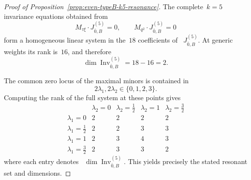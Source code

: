 \documentclass[12pt,a4paper]{amsart}
\theoremstyle{thm}
\theoremstyle{definition}
\begin{document}
\begin{proof}[Proof of Proposition~\textup{\ref{prop:even-typeB-k5-resonance}}]
The complete~\(k=5\) invariance equations obtained from
\[
M_{\tau\xi}\cdot J_{\bar0,B}^{(5)}=0,
\qquad
M_{q^2}\cdot J_{\bar0,B}^{(5)}=0
\]
form a homogeneous linear system in the~\(18\) coefficients of~%
\(J_{\bar0,B}^{(5)}\). At generic weights its rank is~\(16\), and
therefore
\[
\dim\operatorname{Inv}_{\bar0,B}^{(5)}=18-16=2.
\]

The common zero locus of the maximal minors is contained in
\[
2\lambda_1,2\lambda_2\in\{0,1,2,3\}.
\]
Computing the rank of the full system at these points gives
\[
\begin{array}{c|cccc}
 & \lambda_2=0
 & \lambda_2=\frac12
 & \lambda_2=1
 & \lambda_2=\frac32 \\ \hline
\lambda_1=0
 &2&2&2&2\\[1mm]
\lambda_1=\frac12
 &2&2&3&3\\[1mm]
\lambda_1=1
 &2&3&4&3\\[1mm]
\lambda_1=\frac32
 &2&3&3&2
\end{array}
\]
where each entry denotes~%
\(\dim\operatorname{Inv}_{\bar0,B}^{(5)}\).
This yields precisely the stated resonant set and dimensions.
\end{proof}
\end{document}
